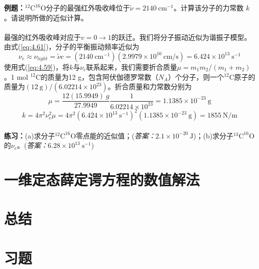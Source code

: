     \begin{examplebox}
        \textbf{例题：}$^{12}\mathrm{C}^{16}\mathrm{O}$分子的最强红外吸收峰位于$\tilde{\nu} = 2140 \:\mathrm{cm}^{-1}$。计算该分子的力常数 $k$。请说明所做的近似计算。\\
        \\
        最强的红外吸收峰对应于$v = 0 \to 1$的跃迁。我们将分子振动近似为谐振子模型。由式(\ref{eq:4.61})，分子的平衡振动频率近似为
        \begin{equation*}
            \nu_e \approx \nu_{light} = \tilde{\nu}c = \left(2140 \:\mathrm{cm}^{-1}\right)\left(2.9979 \times 10^{10} \:\mathrm{cm/s}\right)  = 6.424 \times 10^{13} \:\mathrm{s}^{-1}
        \end{equation*}
        使用式(\ref{eq:4.59})，将$k$与$\nu_e$联系起来，我们需要折合质量$\mu = m_1m_2/\left(m_1+m_2\right)$。1 mol $^{12}\mathrm{C}$的质量为12 g，包含阿伏伽德罗常数（$N_A$）个分子，则一个$^{12}\mathrm{C}$原子的质量为$\left(12 \: \mathrm{g} \right)/ \left(6.02214 \times 10^{23}\right)$。折合质量和力常数分别为
        \begin{equation*}
            \mu = \frac{12 \left(15.9949\right)\: g}{27.9949} \frac{1}{6.02214 \times 10^{23}} = 1.1385 \times 10^{-23} \:\mathrm{g}
        \end{equation*}
        \begin{equation*}
            k = 4\pi^2 \nu_e^2\mu = 4\pi^2 \left(6.424 \times 10^{13} \:\mathrm{s}^{-1}\right)^2\left(1.1385 \times 10^{-23} \:\mathrm{g}\right) = 1855 \: \mathrm{N} / \mathrm{m}
        \end{equation*}
        \\
        \textbf{练习：}(a)求分子$^{12}\mathrm{C}^{16}\mathrm{O}$零点能的近似值；(\textit{答案：}$2.1 \times 10^{-20} \:\mathrm{J}$)；(b)求分子$^{13}\mathrm{C}^{16}\mathrm{O}$的$\nu_e$。(\textit{答案：}$6.28 \times 10^{13} \:\mathrm{s}^{-1}$)
    \end{examplebox}












\section{一维定态薛定谔方程的数值解法}
\label{sec:4.4 Numerical Solutions of the One-Dimensional Time-Independent Schrödinger Equation}

\section*{总结}

\section*{习题}
